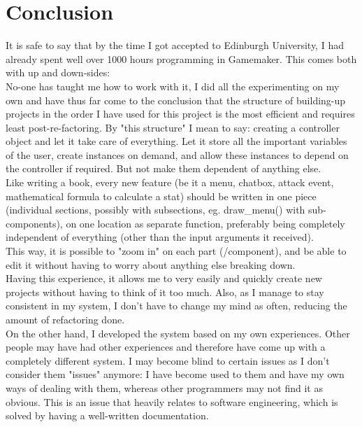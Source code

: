 \documentclass[12pt]{report}
\begin{document}
\section*{Conclusion}
It is safe to say that by the time I got accepted to Edinburgh University, I had already spent well over 1000 hours programming in Gamemaker. This comes both with up and down-sides:\\
No-one has taught me how to work with it, I did all the experimenting on my own and have thus far come to the conclusion that the structure of building-up projects in the order I have used for this project is the most efficient and requires least post-re-factoring. By "this structure" I mean to say: creating a controller object and let it take care of everything. Let it store all the important variables of the user, create instances on demand, and allow these instances to depend on the controller if required. But not make them dependent of anything else.\\
Like writing a book, every new feature (be it a menu, chatbox, attack event, mathematical formula to calculate a stat) should be written in one piece (individual sections, possibly with subsections, eg. draw\_menu() with sub-components), on one location as separate function, preferably being completely independent of everything (other than the input arguments it received).\\
This way, it is possible to "zoom in" on each part (/component), and be able to edit it without having to worry about anything else breaking down.\\
Having this experience, it allows me to very easily and quickly create new projects without having to think of it too much. Also, as I manage to stay consistent in my system, I don't have to change my mind as often, reducing the amount of refactoring done.\\
On the other hand, I developed the system based on my own experiences. Other people may have had other experiences and therefore have come up with a completely different system. I may become blind to certain issues as I don't consider them "issues" anymore: I have become used to them and have my own ways of dealing with them, whereas other programmers may not find it as obvious. This is an issue that heavily relates to software engineering, which is solved by having a well-written documentation.
\end{document}
